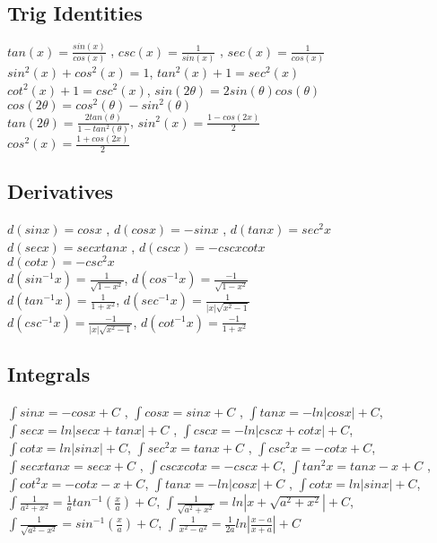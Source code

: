 \subsection*{Trig Identities}
$tan(x) = \frac{sin(x)}{cos(x)}$ , $csc(x) = \frac{1}{sin(x)}$ , $sec(x) = \frac{1}{cos(x)}$ \\
$sin^2(x) + cos^2(x) = 1$, $tan^2(x) + 1 = sec^2(x)$ \\
$cot^2(x) + 1 = csc^2(x)$, $sin(2\theta) = 2sin(\theta)cos(\theta)$ \\
$cos(2\theta) = cos^2(\theta) - sin^2(\theta)$ \\
$tan(2\theta) = \frac{2tan(\theta)}{1-tan^2(\theta)}$, $sin^2(x) = \frac{1-cos(2x)}{2} $ \\
$cos^2(x) = \frac{1+cos(2x)}{2} $ \\
\subsection*{Derivatives}
$d(sinx) = cosx$ , $d(cosx) = -sinx$ , $d(tanx) = sec^2x$ \\
$d(secx) = secxtanx$ , $d(cscx) = -cscxcotx$ \\
$d(cotx) = -csc^2x$ \\
$d(sin^{-1}x) = \frac{1}{\sqrt{1-x^2}}$, $d(cos^{-1}x) = \frac{-1}{\sqrt{1-x^2}}$ \\
$d(tan^{-1}x) = \frac{1}{1+x^2}$, $d(sec^{-1}x) = \frac{1}{|x|\sqrt{x^2-1}}$ \\
$d(csc^{-1}x) = \frac{-1}{|x|\sqrt{x^2-1}}$, $d(cot^{-1}x) = \frac{-1}{1+x^2}$ \\
\subsection*{Integrals}
$\int sinx = -cosx + C$ , $\int cosx = sinx + C$ , $\int tanx = -ln|cosx| + C$, 
$\int secx = ln|secx + tanx| + C$ , $\int cscx = -ln|cscx + cotx| + C$, 
$\int cotx = ln|sinx| + C$, 
$\int sec^2x = tanx + C$ , $\int csc^2x = -cotx + C$, 
$\int secxtanx = secx + C$ , $\int cscxcotx = -cscx + C$, 
$\int tan^2x = tanx - x + C$ , $\int cot^2x = -cotx - x + C$, 
$\int tanx = -ln|cosx| + C$ , $\int cotx = ln|sinx| + C$, 
$\int \frac{1}{a^2 + x^2} = \frac{1}{a}tan^{-1}(\frac{x}{a}) + C$, 
$\int \frac{1}{\sqrt{a^2 + x^2}} = ln|x + \sqrt{a^2 + x^2}| + C$, 
$\int \frac{1}{\sqrt{a^2 - x^2}} = sin^{-1}(\frac{x}{a}) + C$, 
$\int \frac{1}{x^2 - a^2} = \frac{1}{2a}ln|\frac{x-a}{x+a}| + C$ \\